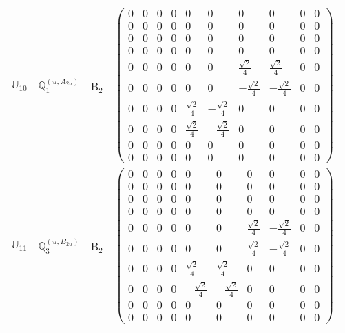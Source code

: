 \documentclass[fleqn,10pt,landscape]{article}
\begin{document}
\begin{itemize}
\begin{center}
\begin{longtable}{c|c|c|c}
$ \mathbb{U}_{10} $ & $\mathbb{Q}_{1}^{(u,A_{2u})}$ & B$_{2}$ & $\begin{pmatrix} 0 & 0 & 0 & 0 & 0 & 0 & 0 & 0 & 0 & 0 \\ 0 & 0 & 0 & 0 & 0 & 0 & 0 & 0 & 0 & 0 \\ 0 & 0 & 0 & 0 & 0 & 0 & 0 & 0 & 0 & 0 \\ 0 & 0 & 0 & 0 & 0 & 0 & 0 & 0 & 0 & 0 \\ 0 & 0 & 0 & 0 & 0 & 0 & \frac{\sqrt{2}}{4} & \frac{\sqrt{2}}{4} & 0 & 0 \\ 0 & 0 & 0 & 0 & 0 & 0 & - \frac{\sqrt{2}}{4} & - \frac{\sqrt{2}}{4} & 0 & 0 \\ 0 & 0 & 0 & 0 & \frac{\sqrt{2}}{4} & - \frac{\sqrt{2}}{4} & 0 & 0 & 0 & 0 \\ 0 & 0 & 0 & 0 & \frac{\sqrt{2}}{4} & - \frac{\sqrt{2}}{4} & 0 & 0 & 0 & 0 \\ 0 & 0 & 0 & 0 & 0 & 0 & 0 & 0 & 0 & 0 \\ 0 & 0 & 0 & 0 & 0 & 0 & 0 & 0 & 0 & 0 \end{pmatrix}$ \\
$ \mathbb{U}_{11} $ & $\mathbb{Q}_{3}^{(u,B_{2u})}$ & B$_{2}$ & $\begin{pmatrix} 0 & 0 & 0 & 0 & 0 & 0 & 0 & 0 & 0 & 0 \\ 0 & 0 & 0 & 0 & 0 & 0 & 0 & 0 & 0 & 0 \\ 0 & 0 & 0 & 0 & 0 & 0 & 0 & 0 & 0 & 0 \\ 0 & 0 & 0 & 0 & 0 & 0 & 0 & 0 & 0 & 0 \\ 0 & 0 & 0 & 0 & 0 & 0 & \frac{\sqrt{2}}{4} & - \frac{\sqrt{2}}{4} & 0 & 0 \\ 0 & 0 & 0 & 0 & 0 & 0 & \frac{\sqrt{2}}{4} & - \frac{\sqrt{2}}{4} & 0 & 0 \\ 0 & 0 & 0 & 0 & \frac{\sqrt{2}}{4} & \frac{\sqrt{2}}{4} & 0 & 0 & 0 & 0 \\ 0 & 0 & 0 & 0 & - \frac{\sqrt{2}}{4} & - \frac{\sqrt{2}}{4} & 0 & 0 & 0 & 0 \\ 0 & 0 & 0 & 0 & 0 & 0 & 0 & 0 & 0 & 0 \\ 0 & 0 & 0 & 0 & 0 & 0 & 0 & 0 & 0 & 0 \end{pmatrix}$ \\

\end{longtable}
\end{center}
\end{itemize}
\end{document}
